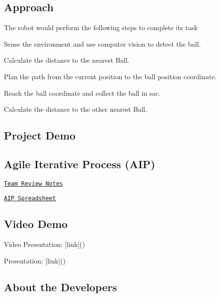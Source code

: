 \subsection*{Approach}

The robot would perform the following steps to complete its task
\begin{DoxyItemize}
\item Sense the environment and use computer vision to detect the ball.
\item Calculate the distance to the nearest Ball.
\item Plan the path from the current position to the ball position coordinate.
\item Reach the ball coordinate and collect the ball in sac.
\item Calculate the distance to the other nearest Ball.
\end{DoxyItemize}

\subsection*{Project Demo}

\subsection*{Agile Iterative Process (A\+IP)}


\begin{DoxyItemize}
\item \href{https://docs.google.com/document/d/1xD4v_xm90qUi-JRTBeB70zwtmSkE1hAyr0sW1udbbTA/edit?usp=sharing}{\tt Team Review Notes}
\item \href{https://docs.google.com/spreadsheets/d/17ZCHpeQtKOI61sXRT4afAt2YDU3qQ2JU7icFp7B_i5g/edit?usp=sharing}{\tt A\+IP Spreadsheet}
\end{DoxyItemize}

\subsection*{Video Demo}


\begin{DoxyItemize}
\item Video Presentation\+: \mbox{[}link\mbox{]}()
\item Presentation\+: \mbox{[}link\mbox{]}()
\end{DoxyItemize}

\subsection*{About the Developers}


